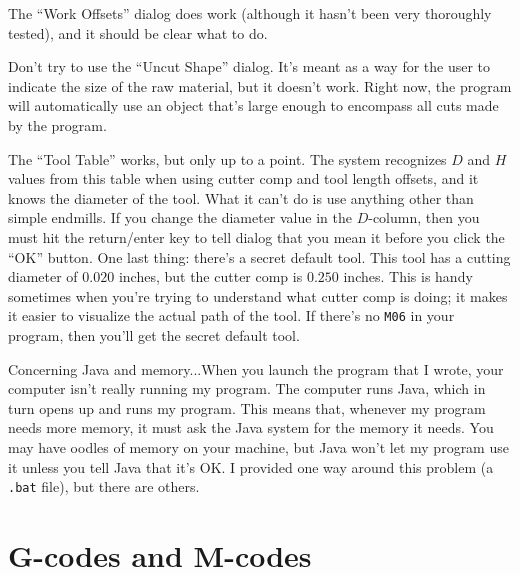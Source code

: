 \documentclass[titlepage,oneside,10pt]{article}
\begin{document}
The ``Work Offsets'' dialog does work (although it hasn't been very
thoroughly tested), and it should be clear what to do. 

Don't try to use the ``Uncut Shape'' dialog. It's meant as a way for
the user to indicate the size of the raw material, but it doesn't
work. Right now, the program will automatically use an object that's
large enough to encompass all cuts made by the program.

The ``Tool Table'' works, but only up to a point. The system
recognizes $D$ and $H$ values from this table when using cutter comp
and tool length offsets, and it knows the diameter of the tool. What
it can't do is use anything other than simple endmills. If you change
the diameter value in the $D$-column, then you must hit the return/enter
key to tell dialog that you mean it before you click the ``OK''
button. One last thing: there's a secret default tool. This tool has a
cutting diameter of $0.020$ inches, but the cutter comp is $0.250$
inches. This is handy sometimes when you're trying to understand what
cutter comp is doing; it makes it easier to visualize the actual path
of the tool. If there's no {\tt M06} in your program, then you'll get
the secret default tool. 

Concerning Java and memory...When you launch the program that I wrote,
your computer isn't really running my program. The computer runs Java,
which in turn opens up and runs my program. This means that, whenever
my program needs more memory, it must ask the Java system for the
memory it needs. You may have oodles of memory on your machine, but
Java won't let my program use it unless you tell Java that it's OK. I
provided one way around this problem (a {\tt .bat} file), but there
are others.

\section{G-codes and M-codes}
\end{document}
